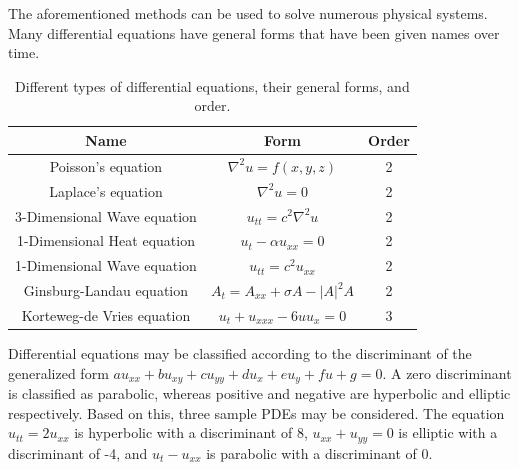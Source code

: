 \documentclass[twocolumn]{article}
\begin{document}
The aforementioned methods can be used to solve numerous physical systems. Many differential equations have general forms that have been given names over time.

\begin{table}
\begin{center}
\begin{tabular}{|c|c|c|}
	\hline Name                        & Form                                & Order \\ 
	\hline Poisson's equation          & $\nabla^2 u = f(x,y,z)$             & 2 \\ 
	\hline Laplace's equation          & $\nabla^2 u = 0$                    & 2 \\ 
	\hline 3-Dimensional Wave equation & $u_{tt} = c^2\nabla^2 u$            & 2 \\ 
	\hline 1-Dimensional Heat equation & $u_t -\alpha u_{xx} = 0$            & 2 \\ 
	\hline 1-Dimensional Wave equation & $u_{tt} = c^2 u_{xx} $              & 2 \\ 
	\hline Ginsburg-Landau equation    & $A_t = A_{xx} + \sigma A - |A|^2 A $& 2 \\ 
	\hline Korteweg-de Vries equation  & $u_t + u_{xxx} - 6u u_{x} = 0 $     & 3 \\ 
	\hline 
\end{tabular}  
\caption{Different types of differential equations, their general forms, and order.}
\label{eq:diff_equations}
\end{center}
\end{table}

Differential equations may be classified according to the discriminant of the generalized form $au_{xx} + bu_{xy} + cu_{yy} + du_{x} +eu_y +fu + g =0$. A zero discriminant is classified as parabolic, whereas positive and negative are hyperbolic and elliptic respectively. Based on this, three sample PDEs may be considered. The equation $u_{tt} = 2u_{xx}$ is hyperbolic with a discriminant of 8, $u_{xx} + u_{yy} = 0$ is elliptic with a discriminant of -4, and $u_t - u_{xx}$ is parabolic with a discriminant of 0.
\end{document}
